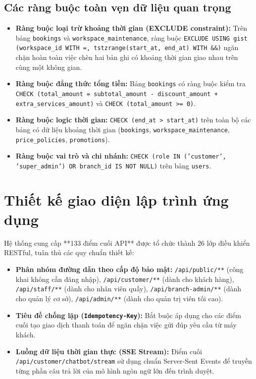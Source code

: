 \subsection{Các ràng buộc toàn vẹn dữ liệu quan trọng}
\begin{itemize}
    \item \textbf{Ràng buộc loại trừ khoảng thời gian (EXCLUDE constraint):} Trên bảng \texttt{bookings} và \texttt{workspace\_maintenance}, ràng buộc \texttt{EXCLUDE USING gist (workspace\_id WITH =, tstzrange(start\_at, end\_at) WITH \&\&)} ngăn chặn hoàn toàn việc chèn hai bản ghi có khoảng thời gian giao nhau trên cùng một không gian.
    \item \textbf{Ràng buộc đẳng thức tổng tiền:} Bảng \texttt{bookings} có ràng buộc kiểm tra \texttt{CHECK (total\_amount = subtotal\_amount - discount\_amount + extra\_services\_amount)} và \texttt{CHECK (total\_amount >= 0)}.
    \item \textbf{Ràng buộc logic thời gian:} \texttt{CHECK (end\_at > start\_at)} trên toàn bộ các bảng có dữ liệu khoảng thời gian (\texttt{bookings}, \texttt{workspace\_maintenance}, \texttt{price\_policies}, \texttt{promotions}).
    \item \textbf{Ràng buộc vai trò và chi nhánh:} \texttt{CHECK (role IN ('customer', 'super\_admin') OR branch\_id IS NOT NULL)} trên bảng \texttt{users}.
\end{itemize}

\section{Thiết kế giao diện lập trình ứng dụng}
\label{sec:thietke_api}

Hệ thống cung cấp **133 điểm cuối API** được tổ chức thành 26 lớp điều khiển RESTful, tuân thủ các quy chuẩn thiết kế:
\begin{itemize}
    \item \textbf{Phân nhóm đường dẫn theo cấp độ bảo mật:} \texttt{/api/public/**} (công khai không cần đăng nhập), \texttt{/api/customer/**} (dành cho khách hàng), \texttt{/api/staff/**} (dành cho nhân viên quầy), \texttt{/api/branch-admin/**} (dành cho quản lý cơ sở), \texttt{/api/admin/**} (dành cho quản trị viên tối cao).
    \item \textbf{Tiêu đề chống lặp (\texttt{Idempotency-Key}):} Bắt buộc áp dụng cho các điểm cuối tạo giao dịch thanh toán để ngăn chặn việc gửi đúp yêu cầu từ máy khách.
    \item \textbf{Luồng dữ liệu thời gian thực (SSE Stream):} Điểm cuối \texttt{/api/customer/chatbot/stream} sử dụng chuẩn Server-Sent Events để truyền từng phần câu trả lời của mô hình ngôn ngữ lớn đến trình duyệt.
\end{itemize}

